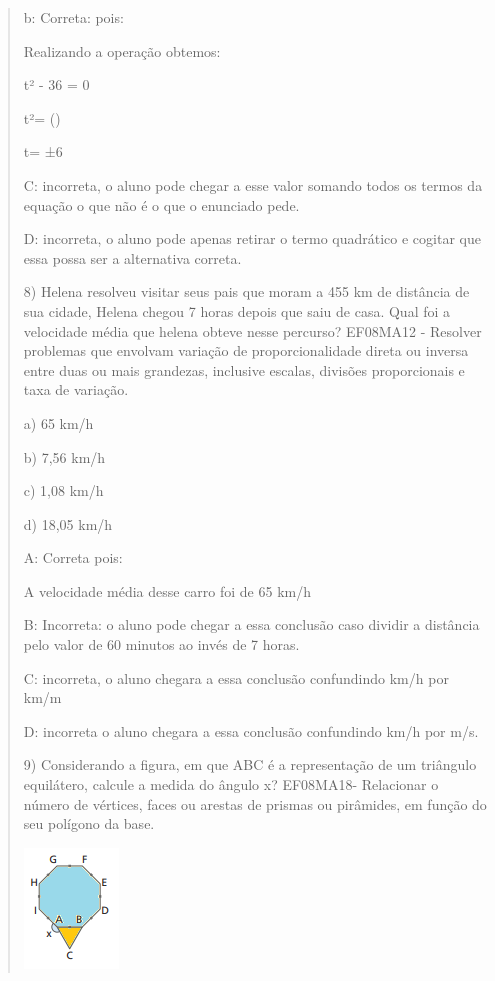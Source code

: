 \begin{quote}
\begin{escolha}
b: Correta: pois:

Realizando a operação obtemos:

t² - 36 = 0

t²= ()

t= ±6

C: incorreta, o aluno pode chegar a esse valor somando todos os termos
da equação o que não é o que o enunciado pede.

D: incorreta, o aluno pode apenas retirar o termo quadrático e cogitar
que essa possa ser a alternativa correta.

8) Helena resolveu visitar seus pais que moram a 455 km de distância de
sua cidade, Helena chegou 7 horas depois que saiu de casa. Qual foi a
velocidade média que helena obteve nesse percurso? EF08MA12 - Resolver
problemas que envolvam variação de proporcionalidade direta ou inversa
entre duas ou mais grandezas, inclusive escalas, divisões proporcionais
e taxa de variação.

a) 65 km/h

b) 7,56 km/h

c) 1,08 km/h

d) 18,05 km/h

A: Correta pois:


A velocidade média desse carro foi de 65 km/h

B: Incorreta: o aluno pode chegar a essa conclusão caso dividir a
distância pelo valor de 60 minutos ao invés de 7 horas.

C: incorreta, o aluno chegara a essa conclusão confundindo km/h por km/m

D: incorreta o aluno chegara a essa conclusão confundindo km/h por m/s.

9) Considerando a figura, em que ABC é a representação de um triângulo
equilátero, calcule a medida do ângulo x? EF08MA18- Relacionar o número
de vértices, faces ou arestas de prismas ou pirâmides, em função do seu
polígono da base.

\includegraphics[width=0.98958in,height=1.26042in]{./imgSAEB_8_MAT/media/image56.png}


\end{escolha}
\end{quote}
